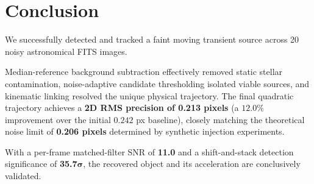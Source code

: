 \documentclass[11pt,a4paper]{article}
\begin{document}
\section{Conclusion}

We successfully detected and tracked a faint moving transient source across 20 noisy astronomical FITS images.

Median-reference background subtraction effectively removed static stellar contamination, noise-adaptive candidate thresholding isolated viable sources, and kinematic linking resolved the unique physical trajectory. The final quadratic trajectory achieves a \textbf{2D RMS precision of 0.213 pixels} (a $12.0\%$ improvement over the initial $0.242$ px baseline), closely matching the theoretical noise limit of \textbf{0.206 pixels} determined by synthetic injection experiments.

With a per-frame matched-filter SNR of \textbf{11.0} and a shift-and-stack detection significance of \textbf{35.7}$\boldsymbol{\sigma}$, the recovered object and its acceleration are conclusively validated.
\end{document}
